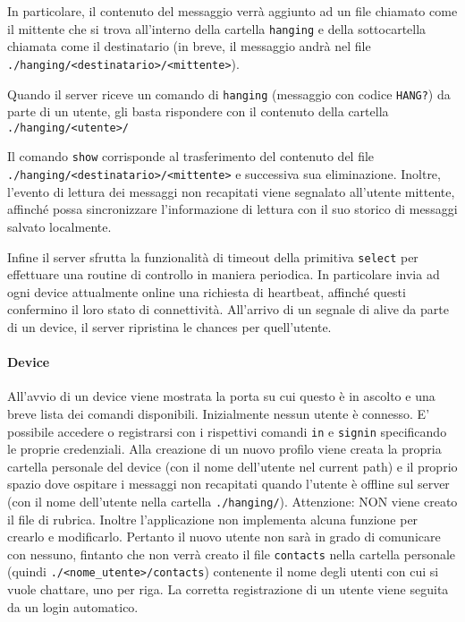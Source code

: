 \documentclass[11pt,a4paper,twocolumn,twoside]{paper}
\begin{document}
    In particolare, il contenuto del messaggio verrà aggiunto ad un file
    chiamato come il mittente che si trova all'interno della cartella 
    \texttt{hanging} e della sottocartella chiamata come il destinatario
	(in breve, il messaggio andrà nel file 
	\texttt{./hanging/\textless{}destinatario\textgreater{}/\textless{}mittente\textgreater{}}).

    Quando il server riceve un comando di \texttt{hanging} (messaggio
    con codice \texttt{HANG?}) da parte di un utente, gli basta
    rispondere con il contenuto della cartella
    \texttt{./hanging/\textless{}utente\textgreater{}/}

    Il comando \texttt{show} corrisponde al trasferimento del contenuto
    del file
    \texttt{./hanging/\textless{}destinatario\textgreater{}/\textless{}mittente\textgreater{}}
    e successiva sua eliminazione. Inoltre, l'evento di lettura dei
    messaggi non recapitati viene segnalato all'utente mittente,
    affinché possa sincronizzare l'informazione di lettura con il suo
    storico di messaggi salvato localmente.

    Infine il server sfrutta la funzionalità di timeout della primitiva
    \texttt{select} per effettuare una routine di controllo in maniera
    periodica. In particolare invia ad ogni device attualmente online
    una richiesta di heartbeat, affinché questi confermino il loro stato
    di connettività. All'arrivo di un segnale di alive da parte di un
    device, il server ripristina le chances per quell'utente.
\paragraph{Device}
	All'avvio di un device viene mostrata la porta su cui questo è in
    ascolto e una breve lista dei comandi disponibili. Inizialmente
    nessun utente è connesso. E' possibile accedere o registrarsi con i
    rispettivi comandi \texttt{in} e \texttt{signin} specificando le
    proprie credenziali. Alla creazione di un nuovo profilo viene creata
    la propria cartella personale del device (con il nome dell'utente
    nel current path) e il proprio spazio dove ospitare i messaggi non
    recapitati quando l'utente è offline sul server (con il nome
    dell'utente nella cartella \texttt{./hanging/}). Attenzione: NON
    viene creato il file di rubrica. Inoltre l'applicazione non
    implementa alcuna funzione per crearlo e modificarlo. Pertanto il
    nuovo utente non sarà in grado di comunicare con nessuno, fintanto
    che non verrà creato il file \texttt{contacts} nella cartella
    personale (quindi
    \texttt{./\textless{}nome\_utente\textgreater{}/contacts})
    contenente il nome degli utenti con cui si vuole chattare, uno per
    riga. La corretta registrazione di un utente viene seguita da un
    login automatico.
\end{document}
